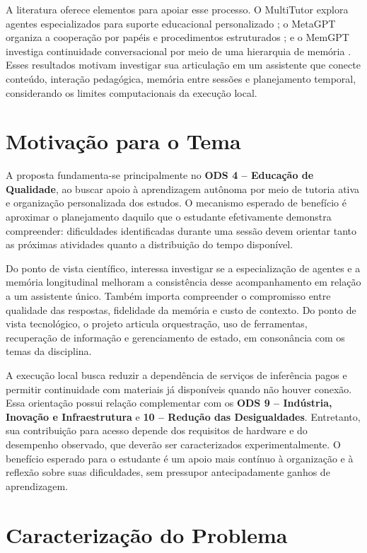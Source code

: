 \documentclass[12pt]{article}
\begin{document}
A literatura oferece elementos para apoiar esse processo. O MultiTutor explora agentes especializados para suporte educacional personalizado \citep{sun2025multitutor}; o MetaGPT organiza a cooperação por papéis e procedimentos estruturados \citep{hong2024metagpt}; e o MemGPT investiga continuidade conversacional por meio de uma hierarquia de memória \citep{packer2023memgpt}. Esses resultados motivam investigar sua articulação em um assistente que conecte conteúdo, interação pedagógica, memória entre sessões e planejamento temporal, considerando os limites computacionais da execução local.

\section{Motivação para o Tema}
\label{sec:motivacao}

A proposta fundamenta-se principalmente no \textbf{ODS 4 -- Educação de Qualidade}, ao buscar apoio à aprendizagem autônoma por meio de tutoria ativa e organização personalizada dos estudos. O mecanismo esperado de benefício é aproximar o planejamento daquilo que o estudante efetivamente demonstra compreender: dificuldades identificadas durante uma sessão devem orientar tanto as próximas atividades quanto a distribuição do tempo disponível.

Do ponto de vista científico, interessa investigar se a especialização de agentes e a memória longitudinal melhoram a consistência desse acompanhamento em relação a um assistente único. Também importa compreender o compromisso entre qualidade das respostas, fidelidade da memória e custo de contexto. Do ponto de vista tecnológico, o projeto articula orquestração, uso de ferramentas, recuperação de informação e gerenciamento de estado, em consonância com os temas da disciplina.

A execução local busca reduzir a dependência de serviços de inferência pagos e permitir continuidade com materiais já disponíveis quando não houver conexão. Essa orientação possui relação complementar com os \textbf{ODS 9 -- Indústria, Inovação e Infraestrutura} e \textbf{10 -- Redução das Desigualdades}. Entretanto, sua contribuição para acesso depende dos requisitos de hardware e do desempenho observado, que deverão ser caracterizados experimentalmente. O benefício esperado para o estudante é um apoio mais contínuo à organização e à reflexão sobre suas dificuldades, sem pressupor antecipadamente ganhos de aprendizagem.

\section{Caracterização do Problema}
\label{sec:problema}
\end{document}
